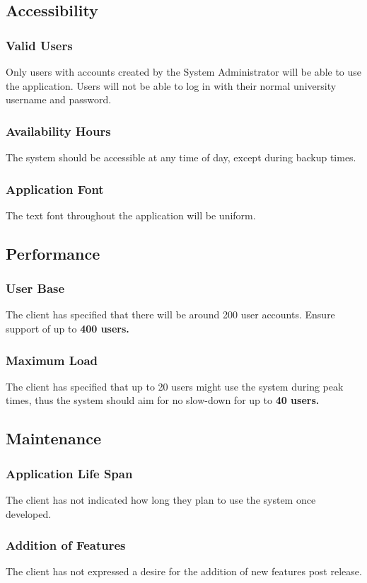 \documentclass{article}
\begin{document}
\subsection{Accessibility}
\subsubsection{Valid Users}
Only users with accounts created by the System Administrator will be able to use
the application. Users will not be able to log in with their normal
university username and password.
\subsubsection{Availability Hours}
The system should be accessible at any time of day, except during backup times.
\subsubsection{Application Font}
The text font throughout the application will be uniform.
\subsection{Performance}
\subsubsection{User Base}
The client has specified that there will be around 200 user accounts. Ensure
support of up to \textbf{400 users.}
\subsubsection{Maximum Load}
The client has specified that up to 20 users might use the system during
peak times, thus the system should aim for no slow-down for up to \textbf{40 users.}
\subsection{Maintenance}
\subsubsection{Application Life Span}
The client has not indicated how long they plan to use the system once developed.
\subsubsection{Addition of Features}
The client has not expressed a desire for the addition of new
features post release.
\end{document}
